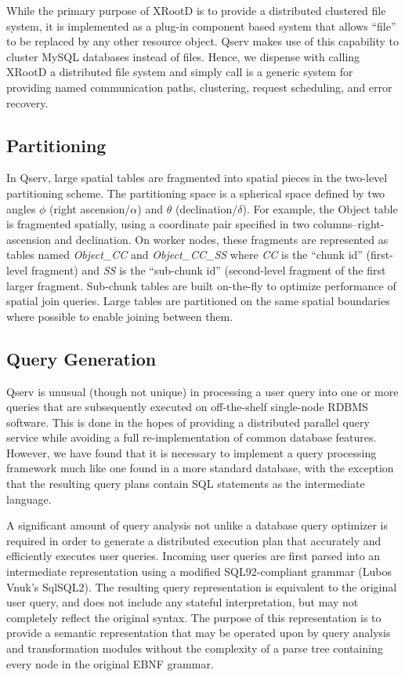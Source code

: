 \documentclass[DM,lsstdraft,toc]{lsstdoc}
\begin{document}
While the primary purpose of XRootD is to
provide a distributed clustered file system, it is implemented as a
plug-in component based system that allows ``file'' to be replaced by
any other resource object. Qserv makes use of this capability to cluster
MySQL databases instead of files. Hence, we dispense with calling
XRootD a distributed file system and simply
call is a generic system for providing named communication paths,
clustering, request scheduling, and error recovery.

\subsection{Partitioning}\label{partitioning-1}

In Qserv, large spatial tables are fragmented into spatial pieces in the
two-level partitioning scheme. The partitioning space is a spherical
space defined by two angles $\phi$ (right ascension/$\alpha$) and $\theta$ (declination/$\delta$).
For example, the Object table is fragmented spatially, using a
coordinate pair specified in two columns--right-ascension and
declination. On worker nodes, these fragments are represented as tables
named \emph{Object\_CC} and \emph{Object\_CC\_SS} where \emph{CC} is the
``chunk id'' (first-level fragment) and \emph{SS} is the ``sub-chunk
id'' (second-level fragment of the first larger fragment. Sub-chunk
tables are built on-the-fly to optimize performance of spatial join
queries. Large tables are partitioned on the same spatial boundaries
where possible to enable joining between them.

\subsection{Query Generation}\label{query-generation}

Qserv is unusual (though not unique) in processing a user query into one
or more queries that are subsequently executed on off-the-shelf
single-node RDBMS software. This is done in the hopes of providing a
distributed parallel query service while avoiding a full
re-implementation of common database features. However, we have found
that it is necessary to implement a query processing framework much like
one found in a more standard database, with the exception that the
resulting query plans contain SQL statements as the intermediate
language.

A significant amount of query analysis not unlike a database query
optimizer is required in order to generate a distributed execution plan
that accurately and efficiently executes user queries. Incoming user
queries are first parsed into an intermediate representation using a
modified SQL92-compliant grammar (Lubos Vnuk's SqlSQL2). The resulting
query representation is equivalent to the original user query, and does
not include any stateful interpretation, but may not completely reflect
the original syntax. The purpose of this representation is to provide a
semantic representation that may be operated upon by query analysis and
transformation modules without the complexity of a parse tree containing
every node in the original EBNF grammar.
\end{document}
